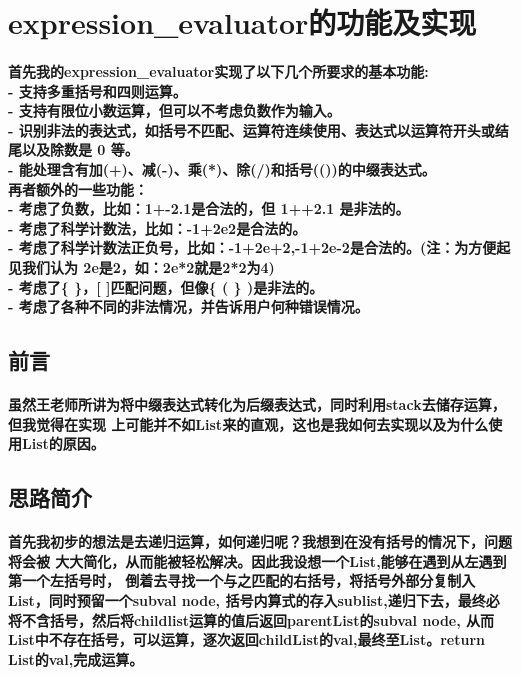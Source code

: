 \documentclass[UTF8]{ctexart}
\begin{document}
\pagestyle{fancy}
\fancyhead{}
\setlength{\headheight}{12.64723pt}

\section{expression\_evaluator的功能及实现}

\paragraph{
首先我的expression\_evaluator实现了以下几个所要求的基本功能: \\
- 支持多重括号和四则运算。\\
- 支持有限位小数运算，但可以不考虑负数作为输入。\\
- 识别非法的表达式，如括号不匹配、运算符连续使用、表达式以运算符开头或结尾以及除数是 0 等。\\
- 能处理含有加(+)、减(-)、乘(*)、除(/)和括号(())的中缀表达式。\\
再者额外的一些功能：\\
- 考虑了负数，比如：1+-2.1是合法的，但 1++2.1 是非法的。\\
- 考虑了科学计数法，比如：-1+2e2是合法的。\\
- 考虑了科学计数法正负号，比如：-1+2e+2,-1+2e-2是合法的。(注：为方便起见我们认为
2e是2，如：2e*2就是2*2为4)\\
- 考虑了\{ \}，[ ]匹配问题，但像\{ ( \} )是非法的。\\
- 考虑了各种不同的非法情况，并告诉用户何种错误情况。\\
}
\subsection{前言}
\paragraph{\hspace{2em}
虽然王老师所讲为将中缀表达式转化为后缀表达式，同时利用stack去储存运算，但我觉得在实现
上可能并不如List来的直观，这也是我如何去实现以及为什么使用List的原因。
}
\subsection{思路简介}
\paragraph{\hspace{2em}
首先我初步的想法是去递归运算，如何递归呢？我想到在没有括号的情况下，问题将会被
大大简化，从而能被轻松解决。因此我设想一个List,能够在遇到从左遇到第一个左括号时，
倒着去寻找一个与之匹配的右括号，将括号外部分复制入List，同时预留一个subval node,
括号内算式的存入sublist,递归下去，最终必将不含括号，然后将childlist运算的值后返回parentList的subval node,
从而List中不存在括号，可以运算，逐次返回childList的val,最终至List。return List的val,完成运算。
}
\end{document}
